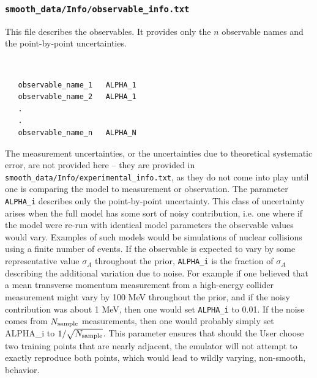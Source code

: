 \documentclass[UserManual.tex]{subfiles}
\begin{document}
\subsubsection{{\tt smooth\_data/Info/observable\_info.txt}}
This file describes the observables. It provides only the $n$ observable names and the point-by-point uncertainties.
{\tt
\begin{verbatim}
   observable_name_1   ALPHA_1
   observable_name_2   ALPHA_1
   .
   .
   observable_name_n   ALPHA_N\end{verbatim}
}
The measurement uncertainties, or the uncertainties due to theoretical systematic error, are not provided here -- they are provided in {\tt smooth\_data/Info/experimental\_info.txt}, as they do not come into play until one is comparing the model to measurement or observation. The parameter {\tt ALPHA\_i} describes only the point-by-point uncertainty. This class of uncertainty arises when the full model has some sort of noisy contribution, i.e. one where if the model were re-run with identical model parameters the observable values would vary. Examples of such models would be simulations of nuclear collisions using a finite number of events. If the observable is expected to vary by some representative value $\sigma_A$ throughout the prior, {\tt ALPHA\_i} is the fraction of $\sigma_A$ describing the additional variation due to noise. For example if one believed that a mean transverse momentum measurement from a high-energy collider measurement might vary by 100 MeV throughout the prior, and if the noisy contribution was about 1 MeV, then one would set {\tt ALPHA\_i} to 0.01. If the noise comes from $N_{\rm sample}$ measurements, then one would probably simply set {ALPHA\_i} to $1/\sqrt{N_{\rm sample}}$. This parameter ensures that should the User choose two training points that are nearly adjacent, the emulator will not attempt to exactly reproduce both points, which would lead to wildly varying, non-smooth, behavior.
\end{document}
